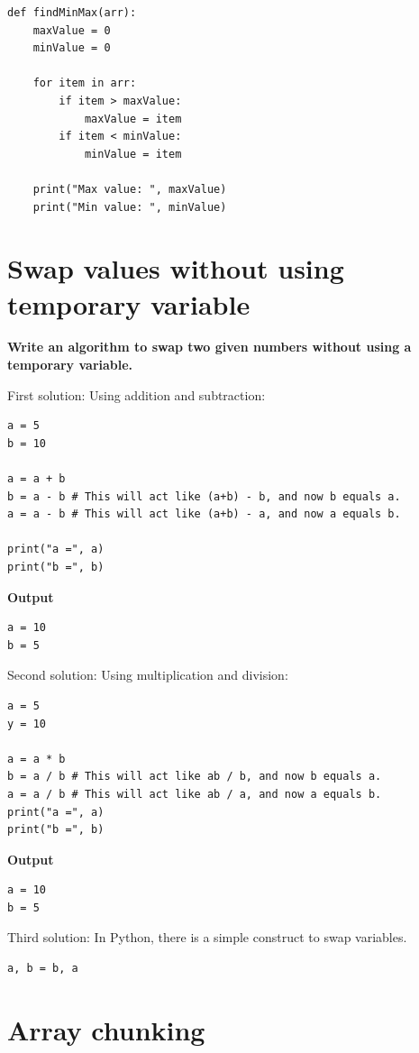 \documentclass[a4paper,11pt]{book}
\begin{document}
\begin{lstlisting}
def findMinMax(arr):
    maxValue = 0
    minValue = 0
    
    for item in arr:
        if item > maxValue:
            maxValue = item
        if item < minValue:
            minValue = item
            
    print("Max value: ", maxValue)
    print("Min value: ", minValue)
\end{lstlisting}

\newpage
\section{Swap values without using temporary variable}

\noindent \textbf{Write an algorithm to swap two given numbers without using a temporary variable.}
\vspace{5mm}

\noindent First solution: Using addition and subtraction:
\begin{lstlisting}
a = 5
b = 10

a = a + b
b = a - b # This will act like (a+b) - b, and now b equals a.
a = a - b # This will act like (a+b) - a, and now a equals b.

print("a =", a)
print("b =", b)
\end{lstlisting}
\textbf{Output}
\begin{lstlisting}
a = 10
b = 5
\end{lstlisting}

\noindent Second solution: Using multiplication and division:
\begin{lstlisting}
a = 5
y = 10

a = a * b
b = a / b # This will act like ab / b, and now b equals a.
a = a / b # This will act like ab / a, and now a equals b.
print("a =", a)
print("b =", b)
\end{lstlisting}
\textbf{Output}
\begin{lstlisting}
a = 10
b = 5
\end{lstlisting}

\noindent Third solution: In Python, there is a simple construct to swap variables. 
\begin{lstlisting}
a, b = b, a
\end{lstlisting}

\newpage
\section{Array chunking}
\end{document}
